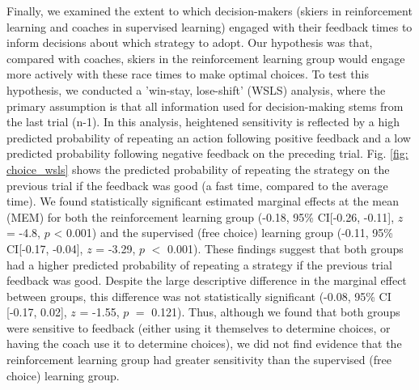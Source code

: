 \documentclass[pdflatex,sn-mathphys-num]{sn-jnl}%
\theoremstyle{thmstyleone}%
\theoremstyle{thmstyletwo}%
\theoremstyle{thmstylethree}%
\begin{document}
Finally, we examined the extent to which decision-makers (skiers in reinforcement learning and coaches in supervised learning) engaged with their feedback times to inform decisions about which strategy to adopt. Our hypothesis was that, compared with coaches, skiers in the reinforcement learning group would engage more actively with these race times to make optimal choices. To test this hypothesis, we conducted a 'win-stay, lose-shift' (WSLS) analysis, where the primary assumption is that all information used for decision-making stems from the last trial (n-1). In this analysis, heightened sensitivity is reflected by a high predicted probability of repeating an action following positive feedback and a low predicted probability following negative feedback on the preceding trial. Fig. \ref{fig: choice_wsls} shows the predicted probability of repeating the strategy on the previous trial if the feedback was good (a fast time, compared to the average time). We found statistically significant estimated marginal effects at the mean (MEM) for both the reinforcement learning group (-0.18, 95\% CI[-0.26, -0.11], $z$ = -4.8, $p$ < 0.001) and the supervised (free choice) learning group (-0.11, 95\% CI[-0.17, -0.04], $z$ = -3.29, $p$ $<$ 0.001). These findings suggest that both groups had a higher predicted probability of repeating a strategy if the previous trial feedback was good. Despite the large descriptive difference in the marginal effect between groups, this difference was not statistically  significant (-0.08, 95\% CI [-0.17, 0.02], $z$ = -1.55, $p$ $=$ 0.121). Thus, although we found that both groups were sensitive to feedback (either using it themselves to determine choices, or having the coach use it to determine choices), we did not find evidence that the reinforcement learning group had greater sensitivity than the supervised (free choice) learning group. 
\end{document}
